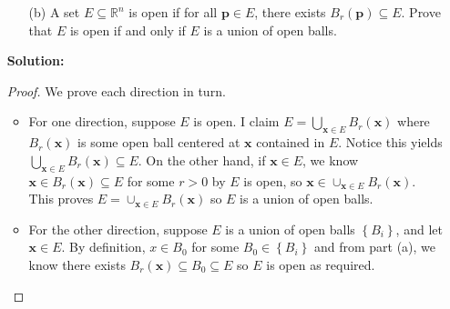 \documentclass[letterpaper,12pt]{article}
\newcommand{\set}[1]{\left\{ #1 \right\}}
\theoremstyle{definition}
\begin{document}
\begin{enumerate}
    \item[] \begin{enumerate}
        \item[(b)] A set $E \subseteq \mathbb{R}^n$ is open if for all $\mathbf{p} \in E$, there exists $B_r(\mathbf{p}) \subseteq E$. Prove that $E$ is open if and only if $E$ is a union of open balls.
    \end{enumerate}
      \begin{mdframed}
            \textbf{Solution:}
            \begin{proof}
               We prove each direction in turn. \begin{itemize}
                    \item For one direction, suppose $E$ is open. I claim $E = \bigcup_{\mathbf{x} \in E} B_r(\mathbf{x})$ where $B_r(\mathbf{x})$ is some open ball centered at $\mathbf{x}$ contained in $E$. Notice this yields $\bigcup_{\mathbf{x} \in E} B_r(\mathbf{x}) \subseteq E$. On the other hand, if $\mathbf{x} \in E$, we know $\mathbf{x} \in B_r(\mathbf{x}) \subseteq E$ for some $r > 0$ by $E$ is open, so $\mathbf{x} \in \cup_{\mathbf{x} \in E} B_r(\mathbf{x})$. This proves $E = \cup_{\mathbf{x} \in E} B_r(\mathbf{x})$ so $E$ is a union of open balls.
                    \item For the other direction, suppose $E$ is a union of open balls $\set{B_i}$, and let $\mathbf{x} \in E$. By definition, $x \in {B}_0$ for some ${B}_0 \in \set{B_i}$ and from part (a), we know there exists $B_r(\mathbf{x}) \subseteq {B}_0 \subseteq E$ so $E$ is open as required.
                \end{itemize}
            \end{proof}
        \end{mdframed}
\end{enumerate}
\pagebreak
\end{document}
